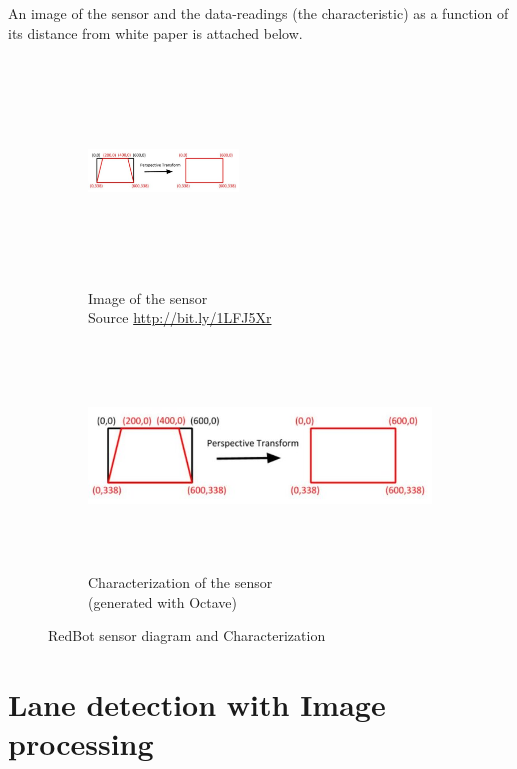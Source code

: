 \documentclass[12pt,a4paper]{article}
\begin{document}
\begin{large}
An image of the sensor and the data-readings (the characteristic) as a function of its distance from white paper is attached below. 

\begin{figure} [hbp]
\centering
  \begin{subfigure}[b]{0.4\textwidth}
  \centering
  \captionsetup{justification=centering}
    \includegraphics[width=4cm, height = 6cm]{images/perspective_transform.jpg}
    \caption{Image of the sensor \\Source \protect\url{http://bit.ly/1LFJ5Xr}}
   
  \end{subfigure}
  \hspace{1cm}
  \begin{subfigure}[b]{0.4\textwidth}
  \centering
  \captionsetup{justification=centering}
    \includegraphics[width=\textwidth, height = 6cm]{images/perspective_transform.jpg}
    \caption{Characterization of the sensor \\(generated with Octave)}
    
  \end{subfigure}
  \caption{RedBot sensor diagram and Characterization}
\end{figure}

\section{Lane detection with Image processing}


\end{large}
\end{document}
